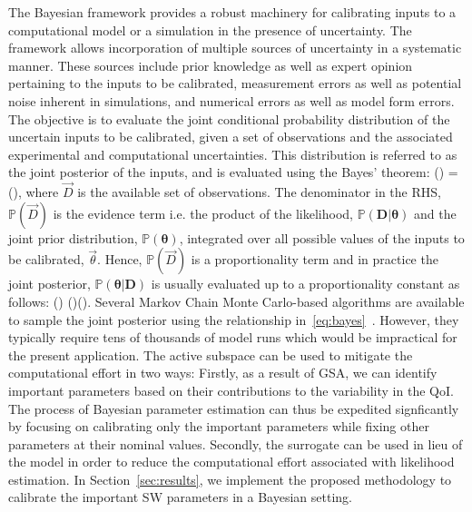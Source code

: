 The Bayesian framework provides a robust machinery for calibrating inputs to a computational model or
a simulation in the presence of uncertainty. The framework allows incorporation of multiple
sources of uncertainty in a systematic manner. These sources include prior knowledge as well as
expert opinion pertaining to the inputs to be calibrated, measurement errors as well as potential noise inherent
in simulations, and numerical errors as well as model form errors. The objective is to evaluate the joint
conditional probability distribution of the uncertain inputs to be calibrated, given a set of observations and the
associated experimental and computational uncertainties. This distribution is referred to as the joint posterior of
the inputs, and is evaluated using the Bayes' theorem:
%
\be
{}(\bm{\theta}\vert {}) = 
(\bm{\theta}),
\ee
%
where $\vec{D}$ is the available set of observations. 
The denominator in the RHS, $\mathbb{P}(\vec{D})$ is the evidence term i.e. the product of the likelihood, 
$\mathbb{P}(\bm{D}\vert\bm{\theta})$ and the joint prior distribution,
$\mathbb{P}(\bm{\theta})$, integrated over all possible values of the inputs to be calibrated, $\vec{\theta}$. 
Hence, $\mathbb{P}(\vec{D})$ is a proportionality term and in practice the joint posterior, 
$\mathbb{P}(\bm{\theta}\vert \bm{D})$ is usually evaluated up to a proportionality constant as follows:
%
\be
{}(\bm{\theta}\vert {}) \propto
{}(\vert\bm{\theta})(\bm{\theta}).
\label{eq:bayes}
\ee
%
Several Markov Chain Monte Carlo-based algorithms are available to sample the joint posterior using the
relationship in~\eqref{eq:bayes}~\cite{Haario:2001, Haario:2006,Xu:2014}.
However, they typically require tens of thousands of model runs which would be
impractical for the present application. The active subspace can be used to mitigate the
computational effort in two ways: Firstly, as a result of GSA, we can identify important parameters based on
their contributions to the variability in the QoI. The process of Bayesian parameter estimation
can thus be expedited signficantly by focusing on calibrating only the important parameters while fixing other
parameters at their nominal values. Secondly, the
surrogate can be used in lieu of the model in order to reduce the computational effort associated with
likelihood estimation. In Section~\ref{sec:results}, we implement the proposed methodology to calibrate the
important SW parameters in a Bayesian setting. 




